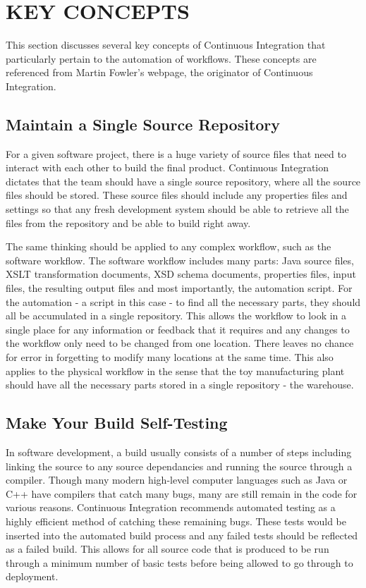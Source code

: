 \section{KEY CONCEPTS} %
\label{sec:key_concepts}
This section discusses several key concepts of Continuous Integration that particularly pertain to the automation of workflows. These concepts are referenced from Martin Fowler's webpage, the originator of Continuous Integration. 

\subsection{Maintain a Single Source Repository} %
\label{sub:maintain_a_single_source_repository}
For a given software project, there is a huge variety of source files that need to interact with each other to build the final product. Continuous Integration dictates that the team should have a single source repository, where all the source files should be stored.  These source files should include any properties files and settings so that any fresh development system should be able to retrieve all the files from the repository and be able to build right away.\newline

The same thinking should be applied to any complex workflow, such as the software workflow. The software workflow includes many parts: Java source files, XSLT transformation documents, XSD schema documents, properties files, input files, the resulting output files and most importantly, the automation script. For the automation - a script in this case - to find all the necessary parts, they should all be accumulated in a single repository. This allows the workflow to look in a single place for any information or feedback that it requires and any changes to the workflow only need to be changed from one location.  There leaves no chance for error in forgetting to modify many locations at the same time. This also applies to the physical workflow in the sense that the toy manufacturing plant should have all the necessary parts stored in a single repository - the warehouse.

\subsection{Make Your Build Self-Testing} %
\label{sub:make_your_build_self_testing}
In software development, a build usually consists of a number of steps including linking the source to any source dependancies and running the source through a compiler. Though many modern high-level computer languages such as Java or C++ have compilers that catch many bugs, many are still remain in the code for various reasons. Continuous Integration recommends automated testing as a highly efficient method of catching these remaining bugs. These tests would be inserted into the automated build process and any failed tests should be reflected as a failed build. This allows for all source code that is produced to be run through a minimum number of basic tests before being allowed to go through to deployment.\newline

